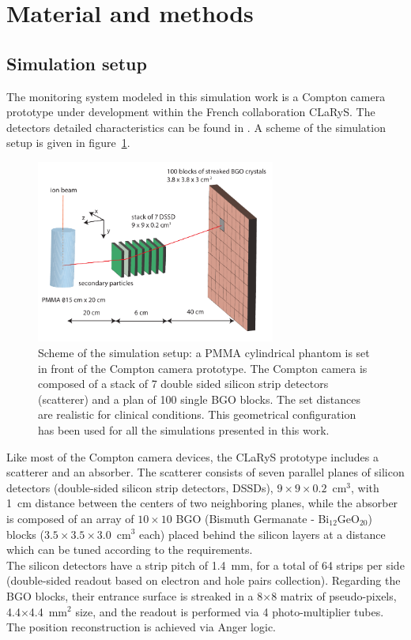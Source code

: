 
\section{Material and methods}

\subsection{Simulation setup}

The monitoring system modeled in this simulation work is a Compton camera prototype under development within the French collaboration CLaRyS. The detectors detailed characteristics can be found in \cite{krimmer:hal-01101334}. A scheme of the simulation setup is given in figure~\ref{fig:fig_setup_CC_simulation_Hadronth}.

\begin{figure}	
  \centering
  \includegraphics[width=0.7\textwidth]{./Figure/Compton_Camera_hadontherapy_PMMA_Cylinder_EN.pdf}
  \caption{Scheme of the simulation setup: a PMMA cylindrical phantom is set in front of the Compton camera prototype. The Compton camera is composed of a stack of 7 double sided silicon strip detectors (scatterer) and a plan of 100 single BGO blocks. The set distances are realistic for clinical conditions. This geometrical configuration has been used for all the simulations presented in this work.}
  \label{fig:fig_setup_CC_simulation_Hadronth}
\end{figure}

Like most of the Compton camera devices, the CLaRyS prototype includes a scatterer and an absorber. The scatterer consists of seven parallel planes of silicon detectors (double-sided silicon strip detectors, DSSDs), $9\times9\times0.2$~cm$^3$, with 1~cm distance between the centers of two neighboring planes, while the absorber is composed of an array of $10\times10$ BGO (Bismuth Germanate - Bi$_{12}$GeO$_{20}$) blocks ($3.5\times3.5\times3.0$~cm$^3$ each) placed behind the silicon layers at a distance which can be tuned according to the requirements.\\ 
The silicon detectors have a strip pitch of 1.4~mm, for a total of 64 strips per side (double-sided readout based on electron and hole pairs collection). 
Regarding the BGO blocks, their entrance surface is streaked in a 8$\times$8 matrix of pseudo-pixels, 4.4$\times$4.4~mm$^{2}$ size, and the readout is performed via 4 photo-multiplier tubes. The position reconstruction is achieved via Anger logic.\\

